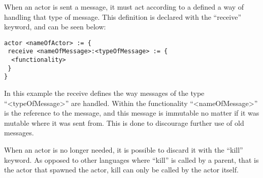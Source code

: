 
When an actor is sent a message, it must act according to a defined a way of handling that type of message. This definition is declared with the \enquote{receive} keyword, and can be seen below:

\label{actorfuncReceive}
\begin{lstlisting}
actor <nameOfActor> := {
 receive <nameOfMessage>:<typeOfMessage> := {
  <functionality>
 }
}
\end{lstlisting}

In this example the receive defines the way messages of the type \enquote{<typeOfMessage>} are handled. Within the functionality \enquote{<nameOfMessage>} is the reference to the message, and this message is immutable no matter if it was mutable where it was sent from. This is done to discourage further use of old messages.

When an actor is no longer needed, it is possible to discard it with the \enquote{kill} keyword. As opposed to other languages where \enquote{kill} is called by a parent, that is the actor that spawned the actor, kill can only be called by the actor itself. 